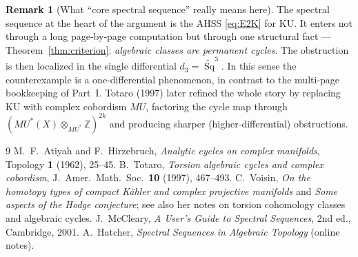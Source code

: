 \documentclass[11pt]{article}
\theoremstyle{definition}
\newtheorem{remark}[theorem]{Remark}
\DeclareMathOperator{\Sq}{Sq}
\newcommand{\Z}{\mathbb{Z}}
\newcommand{\KU}{\mathrm{KU}}
\begin{document}
\begin{remark}[What ``core spectral sequence'' really means here]
The spectral sequence at the heart of the argument is the AHSS
\eqref{eq:E2K} for $\KU$. It enters not through a long page‑by‑page computation
but through one structural fact --- Theorem~\ref{thm:criterion}: \emph{algebraic
classes are permanent cycles}. The obstruction is then localized in the single
differential $d_3=\widetilde{\Sq}^3$. In this sense the counterexample is a
one‑differential phenomenon, in contrast to the multi‑page bookkeeping of Part~I.
Totaro (1997) later refined the whole story by replacing $\KU$ with complex
cobordism $MU$, factoring the cycle map through $(MU^*(X)\otimes_{MU^*}\Z)^{2k}$
and producing sharper (higher‑differential) obstructions.
\end{remark}

\begin{thebibliography}{9}
 M.~F.~Atiyah and F.~Hirzebruch,
\emph{Analytic cycles on complex manifolds}, Topology \textbf{1} (1962), 25--45.
 B.~Totaro,
\emph{Torsion algebraic cycles and complex cobordism},
J.\ Amer.\ Math.\ Soc.\ \textbf{10} (1997), 467--493.
 C.~Voisin,
\emph{On the homotopy types of compact K\"ahler and complex projective manifolds}
and \emph{Some aspects of the Hodge conjecture}; see also her notes on torsion
cohomology classes and algebraic cycles.
 J.~McCleary,
\emph{A User's Guide to Spectral Sequences}, 2nd ed., Cambridge, 2001.
 A.~Hatcher,
\emph{Spectral Sequences in Algebraic Topology} (online notes).
\end{thebibliography}
\end{document}
